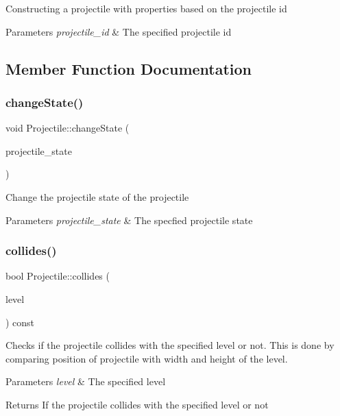 Constructing a projectile with properties based on the projectile id 
\begin{DoxyParams}{Parameters}
{\em projectile\+\_\+id} & The specified projectile id \\
\hline
\end{DoxyParams}


\subsection{Member Function Documentation}
\mbox{\label{classProjectile_a0ecfd73e9c4fe504f635d9b318cd241a}} 
\subsubsection{\texorpdfstring{change\+State()}{changeState()}}
{\footnotesize\ttfamily void Projectile\+::change\+State (\begin{DoxyParamCaption}\item[{Projectile\+\_\+\+State}]{projectile\+\_\+state }\end{DoxyParamCaption})}

Change the projectile state of the projectile 
\begin{DoxyParams}{Parameters}
{\em projectile\+\_\+state} & The specfied projectile state \\
\hline
\end{DoxyParams}
\mbox{\label{classProjectile_a54f456e92b08f461ae7410da49757f3f}} 
\subsubsection{\texorpdfstring{collides()}{collides()}}
{\footnotesize\ttfamily bool Projectile\+::collides (\begin{DoxyParamCaption}\item[{\hyperlink{classLevel}{Level} const \&}]{level }\end{DoxyParamCaption}) const}

Checks if the projectile collides with the specified level or not. This is done by comparing position of projectile with width and height of the level. 
\begin{DoxyParams}{Parameters}
{\em level} & The specified level \\
\hline
\end{DoxyParams}
\begin{DoxyReturn}{Returns}
If the projectile collides with the specified level or not 
\end{DoxyReturn}
\mbox{\label{classProjectile_a845770fb2b5806e1729e4bbda85849f7}} 
